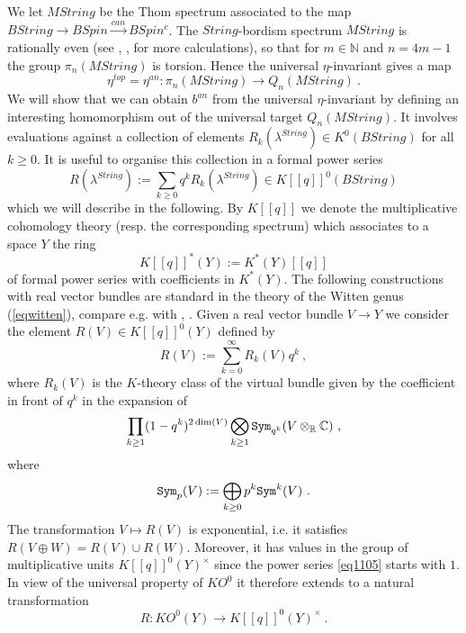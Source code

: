 \documentclass[12pt]{article}
\newcommand{\nat}{{\mathbb{N}}}
\newcommand{\R}{{\mathbb{R}}}
\newcommand{\C}{{\mathbb{C}}}
\newcommand{\Sym}{{\tt Sym}}
\begin{document}
  
We let $MString$ be the Thom spectrum associated to the map
$BString\to BSpin\stackrel{can}{\to} BSpin^{c}$.
The $String$-bordism spectrum $MString$ is rationally even (see \cite{MR2465746}, \cite{MR1297530}, \cite{MR1455523} for more calculations), so that for $m\in \nat$ and $n=4m-1$ the group
$\pi_{n}(MString)$ is torsion. Hence the universal $\eta$-invariant gives a map
$$\eta^{top}=\eta^{an}:\pi_{n}(MString)\to Q_{n}(MString)\ .$$
We will show that we can obtain $b^{an}$ from the universal $\eta$-invariant by defining an interesting homomorphism out of the universal target $Q_{n}(MString)$. It involves  evaluations against a collection of elements
$R_{k}(\lambda^{String})\in K^{0}(BString)$ for all $k\ge 0$. It is useful to organise this collection in a formal power series
$$R(\lambda^{String}):=\sum_{k\ge 0} q^{k} R_{k}(\lambda^{String})\in K[[q]]^{0}(BString)$$
which we will describe in the following.
By  $K[[q]]$ we denote the multiplicative cohomology theory (resp. the corresponding spectrum) which associates to a  space
$Y$ the  ring $$K[[q]]^{*}(Y):=K^{*}(Y)[[q]]$$ of formal power series with  coefficients in $K^*(Y)$.
The following constructions with real vector bundles are standard in the theory of the Witten genus (\ref{eqwitten}), compare e.g. with  \cite{MR1189136}, \cite{2009arXiv0912.4875B}.
 Given a real vector bundle $V\to Y$
we consider the element
$R(V)\in K[[q]]^{0}(Y)$
defined by
\begin{equation}\label{eq1105}R(V):=\sum_{k=0}^{\infty} R_{k}(V)q^{k}\ ,\end{equation}
where $R_{k}(V)$ is the $K$-theory class of the virtual bundle
given by the coefficient in front of $q^{k}$ in the expansion of 
$$\prod_{k\ge 1} (1-q^{k})^{2\dim(V)} \bigotimes_{k\ge 1} \Sym_{q^{k}}(V\otimes_{\R}\C)\ ,$$
where $$\Sym_{p}(V):=\bigoplus_{k\ge 0} p^{k}\Sym^{k}(V)\ .$$
The transformation $V\mapsto R(V)$ is exponential, i.e. it satisfies
$R(V\oplus W)=R(V)\cup R(W)$. Moreover, it  has values in the group of multiplicative units $K[[q]]^{0}(Y)^{\times}$ since the power series \eqref{eq1105} starts with $1$. In view of the universal property of $KO^{0}$ it therefore extends to a natural transformation
$$R:KO^{0}(Y)\to K[[q]]^{0}(Y)^{\times} \ .$$
\end{document}
